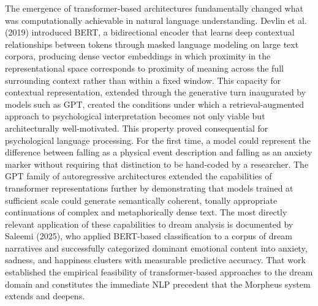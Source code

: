 \documentclass[12pt,a4paper]{report}
\begin{document}
The emergence of transformer-based architectures fundamentally changed what was computationally achievable in natural language understanding. Devlin et al. (2019) introduced BERT, a bidirectional encoder that learns deep contextual relationships between tokens through masked language modeling on large text corpora, producing dense vector embeddings in which proximity in the representational space corresponds to proximity of meaning across the full surrounding context rather than within a fixed window. This capacity for contextual representation, extended through the generative turn inaugurated by models such as GPT, created the conditions under which a retrieval-augmented approach to psychological interpretation becomes not only viable but architecturally well-motivated. This property proved consequential for psychological language processing. For the first time, a model could represent the difference between \textquotedbl{}falling\textquotedbl{} as a physical event description and \textquotedbl{}falling\textquotedbl{} as an anxiety marker without requiring that distinction to be hand-coded by a researcher. The GPT family of autoregressive architectures extended the capabilities of transformer representations further by demonstrating that models trained at sufficient scale could generate semantically coherent, tonally appropriate continuations of complex and metaphorically dense text. The most directly relevant application of these capabilities to dream analysis is documented by Saleemi (2025), who applied BERT-based classification to a corpus of dream narratives and successfully categorized dominant emotional content into anxiety, sadness, and happiness clusters with measurable predictive accuracy. That work established the empirical feasibility of transformer-based approaches to the dream domain and constitutes the immediate NLP precedent that the Morpheus system extends and deepens.
\end{document}
